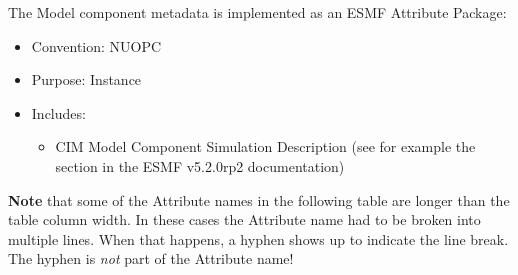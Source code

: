 \label{ModelCompMeta}
The Model component metadata is implemented as an ESMF Attribute Package:

\begin{itemize}
    \item Convention: NUOPC
    \item Purpose: Instance
    \item Includes:
    \begin{itemize}
      \item CIM Model Component Simulation Description (see for example the  section in the ESMF v5.2.0rp2 documentation)
    \end{itemize} 
\end{itemize}

{\bf Note} that some of the Attribute names in the following table are longer than the table column width. In these cases the
Attribute name had to be broken into multiple lines. When that happens, a hyphen shows up to indicate the line break. The hyphen
is {\em not} part of the Attribute name!


